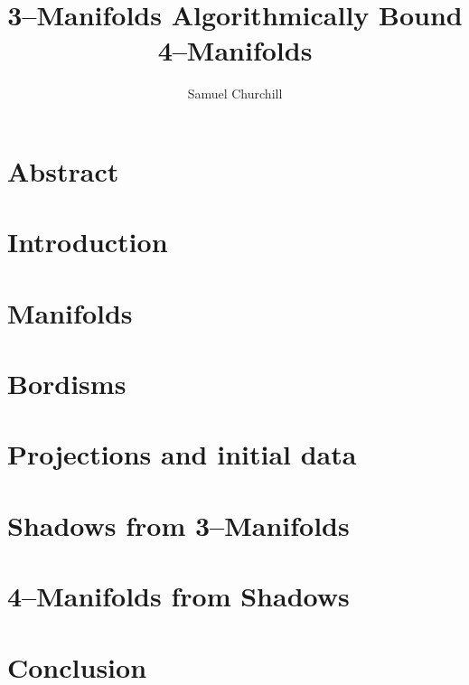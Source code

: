 \documentclass[12pt]{report}
\author{Samuel Churchill}
\title{3--Manifolds Algorithmically Bound 4--Manifolds}
\begin{document}
\maketitle

\chapter*{Abstract}

\tableofcontents

\chapter{Introduction}


\chapter{Manifolds}


\chapter{Bordisms}


\chapter{Projections and initial data}
\label{cha:projection}


\chapter{Shadows from 3--Manifolds}
\label{cha:shadow}


\chapter{4--Manifolds from Shadows}
\label{cha:manifold}


\chapter{Conclusion}



% 

{}

\end{document}
